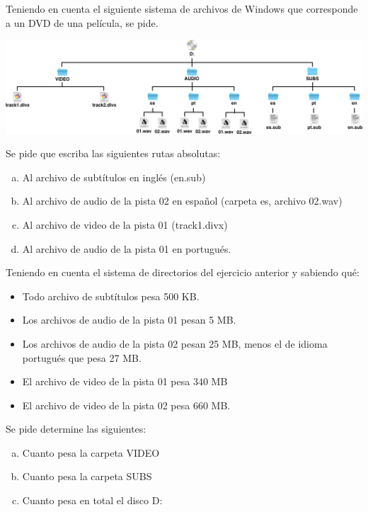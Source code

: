 \begin{exercise}
Teniendo en cuenta el siguiente sistema de archivos de Windows que
corresponde a un DVD de una película, se pide.

\centerline{\includegraphics[scale=0.4]{capitulos/informatica/imagenes/directorios_windows_4.png}}

Se pide que escriba las siguientes rutas absolutas:
\begin{enumerate}[a)]
    \item Al archivo de subtítulos en inglés (en.sub)
    \item Al archivo de audio de la pista 02 en español (carpeta es, archivo 02.wav)
    \item Al archivo de video de la pista 01 (track1.divx)
    \item Al archivo de audio de la pista 01 en portugués.
\end{enumerate}
\end{exercise}

\begin{exercise}
Teniendo en cuenta el sistema de directorios del ejercicio anterior y
sabiendo qué:
\begin{itemize}
    \item Todo archivo de subtítulos pesa 500 KB.
    \item Los archivos de audio de la pista 01 pesan 5 MB.
    \item Los archivos de audio de la pista 02 pesan 25 MB, menos el de idioma
        portugués que pesa 27 MB.
    \item El archivo de video de la pista 01 pesa 340 MB
    \item El archivo de video de la pista 02 pesa 660 MB.
\end{itemize}

Se pide determine las siguientes:
\begin{enumerate}[a)]
    \item Cuanto pesa la carpeta VIDEO
    \item Cuanto pesa la carpeta SUBS
    \item Cuanto pesa en total el disco D:
\end{enumerate}
\end{exercise}

